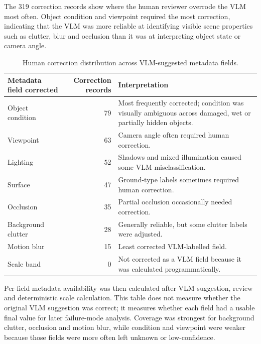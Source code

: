 The 319 correction records show where the human reviewer overrode the VLM most often. Object condition and viewpoint required the most correction, indicating that the VLM was more reliable at identifying visible scene properties such as clutter, blur and occlusion than it was at interpreting object state or camera angle.

\begin{table}[H]
\centering
\small
\renewcommand{\arraystretch}{1.2}
\begin{tabularx}{\textwidth}{p{} r X}
\toprule
\textbf{Metadata field corrected} & \textbf{Correction records} & \textbf{Interpretation} \\
\midrule
Object condition & 79 & Most frequently corrected; condition was visually ambiguous across damaged, wet or partially hidden objects. \\
Viewpoint & 63 & Camera angle often required human correction. \\
Lighting & 52 & Shadows and mixed illumination caused some VLM misclassification. \\
Surface & 47 & Ground-type labels sometimes required human correction. \\
Occlusion & 35 & Partial occlusion occasionally needed correction. \\
Background clutter & 28 & Generally reliable, but some clutter labels were adjusted. \\
Motion blur & 15 & Least corrected VLM-labelled field. \\
Scale band & 0 & Not corrected as a VLM field because it was calculated programmatically. \\
\bottomrule
\end{tabularx}
\caption{Human correction distribution across VLM-suggested metadata fields.}
\label{tab:dce_results_metadata_corrections}
\end{table}

Per-field metadata availability was then calculated after VLM suggestion, review and deterministic scale calculation. This table does not measure whether the original VLM suggestion was correct; it measures whether each field had a usable final value for later failure-mode analysis. Coverage was strongest for background clutter, occlusion and motion blur, while condition and viewpoint were weaker because those fields were more often left unknown or low-confidence.

